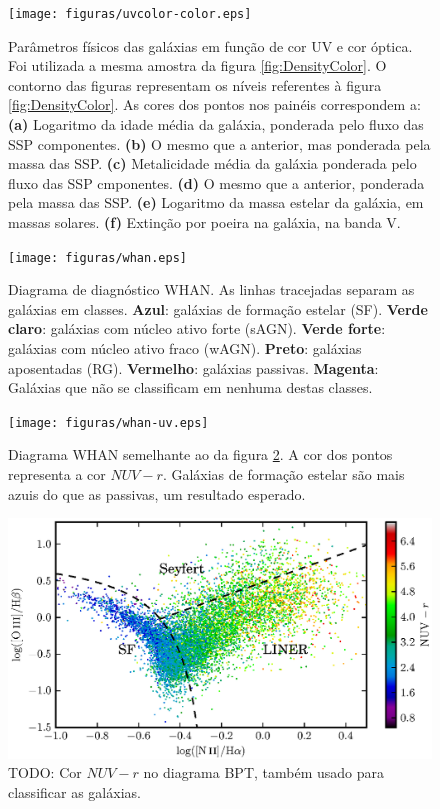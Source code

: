 \begin{figure}
	\texttt{[image: figuras/uvcolor-color.eps]}
	\caption[Diagrama cor--cor UV para os diversos parâmetros \starlight.]
	{Parâmetros físicos das galáxias em função de cor UV e cor óptica. Foi
	utilizada a mesma amostra da figura \ref{fig:DensityColor}. O contorno
	das figuras representam os níveis referentes à figura \ref{fig:DensityColor}.
	As cores dos pontos nos painéis correspondem a: {\bf (a)} Logaritmo da idade
	média da galáxia, ponderada pelo fluxo das SSP componentes. {\bf (b)} O mesmo
	que a anterior, mas ponderada pela massa das SSP. {\bf (c)} Metalicidade média
	da galáxia ponderada pelo fluxo das SSP cmponentes. {\bf (d)} O mesmo que a
	anterior, ponderada pela massa das SSP. {\bf (e)} Logaritmo da massa estelar da
	galáxia, em massas solares. {\bf (f)} Extinção por poeira na galáxia, na banda
	V.}
	\label{fig:ColorStarlightParam}
\end{figure}

\begin{figure}
	\texttt{[image: figuras/whan.eps]}
	\caption[Diagrama de diagnóstico WHAN.]
	{Diagrama de diagnóstico WHAN. As linhas tracejadas separam as galáxias
	em classes. {\bf Azul}: galáxias de formação estelar (SF). {\bf Verde
	claro}: galáxias com núcleo ativo forte (sAGN). {\bf Verde forte}:
	galáxias com núcleo ativo fraco (wAGN). {\bf Preto}: galáxias aposentadas
	(RG). {\bf Vermelho}: galáxias passivas. {\bf Magenta}: Galáxias que não se
	classificam em nenhuma destas classes.}
	\label{fig:Whan}
\end{figure}

\begin{figure}
	\texttt{[image: figuras/whan-uv.eps]}
	\caption[Cores ultravioleta no diagrama WHAN.]
	{Diagrama WHAN semelhante ao da figura \ref{fig:Whan}. A cor dos pontos
	representa a cor $NUV-r$. Galáxias de formação estelar são mais azuis do que
	as passivas, um resultado esperado.}
	\label{fig:WhanUV}
\end{figure}

\begin{figure}
	\includegraphics{figuras/bpt-uv.eps}
	\caption[Cores ultravioleta no diagrama BPT.]
	{TODO: Cor $NUV-r$ no diagrama BPT, também usado para classificar as galáxias.}
	\label{fig:BPTUV}
\end{figure}

